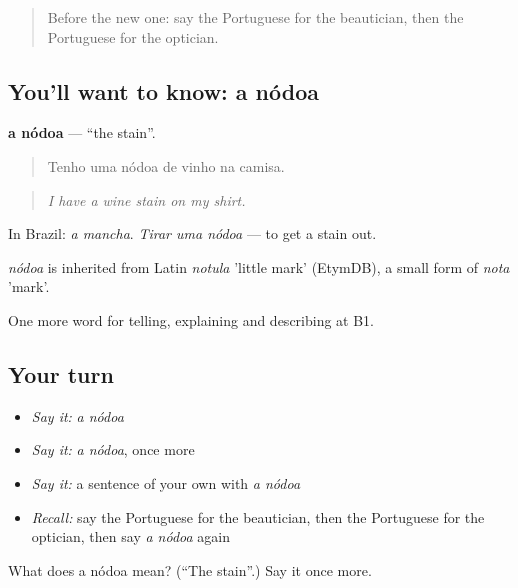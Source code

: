\label{lesson:PT-C452-nodoa}



\begin{quote}
Before the new one: say the Portuguese for the beautician, then the Portuguese for the optician.
\end{quote}

\subsection*{You'll want to know: a nódoa}
\textbf{a nódoa} — \textquotedblleft{}the stain\textquotedblright{}.

\begin{quote}
Tenho uma nódoa de vinho na camisa.
\end{quote}

\begin{quote}
\emph{I have a wine stain on my shirt.}
\end{quote}

In Brazil: \emph{a mancha}. \emph{Tirar uma nódoa} — to get a stain out.

\begin{cousinweb}
\emph{nódoa} is inherited from Latin \emph{notula} 'little mark' (EtymDB), a small form of \emph{nota} 'mark'.
\end{cousinweb}

\begin{grammarlens}[title={What you've built}]
One more word for telling, explaining and describing at B1.
\end{grammarlens}

\subsection*{Your turn}
\begin{itemize}
\raggedright
  \item \emph{Say it:} \emph{a nódoa}
  \item \emph{Say it:} \emph{a nódoa}, once more
  \item \emph{Say it:} a sentence of your own with \emph{a nódoa}
  \item \emph{Recall:} say the Portuguese for the beautician, then the Portuguese for the optician, then say \emph{a nódoa} again
\end{itemize}

\begin{tcolorbox}[breakable,colback=teal!4,colframe=teal!35!black,title={Before you move on}]
What does a nódoa mean? (\textquotedblleft{}The stain\textquotedblright{}.) Say it once more.
\end{tcolorbox}
